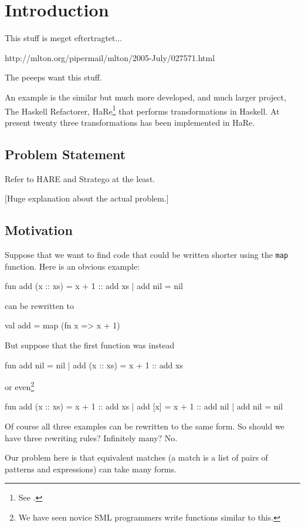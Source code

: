 \chapter{Introduction}

This stuff is meget eftertragtet...

http://mlton.org/pipermail/mlton/2005-July/027571.html 

The peeeps want this stuff.

An example is the similar but much more developed, and much larger project, The
Haskell Refactorer, HaRe\footnote{See \cite{HARE}.} that performs
transformations in Haskell. At present twenty three transformations has been
implemented in HaRe.



\section{Problem Statement}

Refer to HARE and Stratego at the least.

{\footnotesize [Huge explanation about the actual problem.]}


\section{Motivation}
\label{sec:motivation}
Suppose that we want to find code that could be written shorter using the
\texttt{map} function.
Here is an obvious example:
\begin{sml}
fun add (x :: xs) = x + 1 :: add xs
  | add nil       = nil
\end{sml}
can be rewritten to
\begin{sml}
val add = map (fn x => x + 1)
\end{sml}

But suppose that the first function was instead
\begin{sml}
fun add nil       = nil
  | add (x :: xs) = x + 1 :: add xs
\end{sml}
or even\footnote{We have seen novice SML programmers write functions similar to
  this.}
\begin{sml}
fun add (x :: xs) = x + 1 :: add xs
  | add [x]       = x + 1 :: add nil
  | add nil       = nil
\end{sml}
Of course all three examples can be rewritten to the same form. So should we
have three rewriting rules? Infinitely many? No.

Our problem here is that equivalent matches (a match is a list of pairs of
patterns and expressions) can take many forms.

